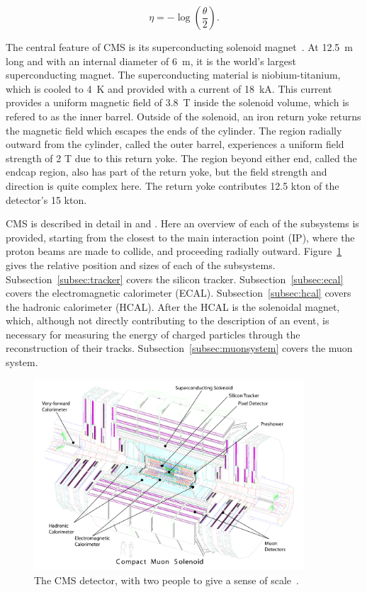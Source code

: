 \begin{equation}
\eta = -\log\left(\frac{\theta}{2}\right) .
\end{equation}

The central feature of CMS is its superconducting solenoid magnet~\cite{cms:solenoid}.
At 12.5~m long and with an internal diameter of 6~m, it is the world's largest superconducting magnet.
The superconducting material is niobium-titanium, which is cooled to 4~K and provided with a current
of 18~kA.
This current provides a uniform magnetic field of 3.8~T inside the solenoid volume, which is refered
to as the inner barrel.
Outside of the solenoid, an iron return yoke returns the magnetic field which escapes the ends
of the cylinder. The region radially outward from the cylinder, called the outer barrel, experiences
a uniform field strength of 2 T due to this return yoke. The region beyond either end, called
the endcap region, also has part of the return yoke, but the field strength
and direction is quite complex here. The return yoke contributes 12.5 kton of the detector's 15 kton.

CMS is described in detail in \cite{Chatrchyan:2008zzk} and \cite{Bayatian:922757}.
Here an overview of each of the subsystems
is provided, starting from the closest to the main interaction point (IP), where the proton beams
are made to collide, and proceeding
radially outward. Figure~\ref{fig:CMS_side} gives the relative position and sizes of each of the
subsystems.
Subsection~\ref{subsec:tracker} covers the silicon tracker. Subsection~\ref{subsec:ecal} covers the
electromagnetic calorimeter (ECAL). Subsection~\ref{subsec:hcal} covers the hadronic calorimeter
(HCAL). After the HCAL is the solenoidal magnet, which, although not directly contributing to the
description of an event, is necessary for measuring the energy of charged particles through
the reconstruction of their tracks. Subsection~\ref{subsec:muonsystem} covers the muon system.

\begin{figure}[ht]
 \begin{center}
   \includegraphics[width=0.90\textwidth]{figures/experiment/cms_complete_labelled.pdf}
      \end{center}
\caption{The CMS detector, with two people to give a sense of scale~\cite{Collaboration:1433717}.}
\label{fig:CMS_side}
\end{figure}

